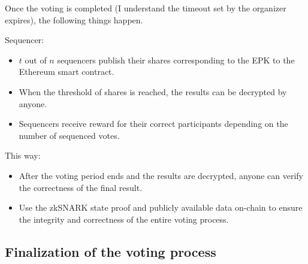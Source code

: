 Once the voting is completed (I understand the timeout set by the organizer expires), the following things happen.

Sequencer:

\begin{itemize}
	\item $t$ out of $n$ sequencers publish their shares corresponding to the EPK to the Ethereum smart contract.
	\item When the threshold of shares is reached, the results can be decrypted by anyone.
	\item Sequencers receive reward for their correct participants depending on the number of sequenced votes.
\end{itemize}

This way:

\begin{itemize}
	\item After the voting period ends and the results are decrypted, anyone can verify the correctness of the final result.
	\item Use the zkSNARK state proof and publicly available data on-chain to ensure the integrity and correctness of the entire voting process.
\end{itemize}

\subsection{Finalization of the voting process}
\label{sec:vocdoni-protocol:finalization}
